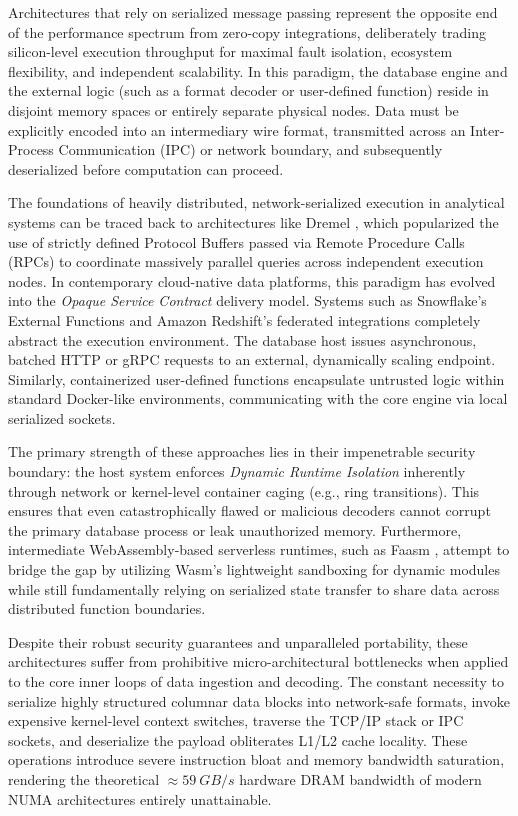 \documentclass[onecolumn]{IEEEtran}
\numberwithin{equation}{section}
\theoremstyle{definition}
\theoremstyle{remark}
\begin{document}
Architectures that rely on serialized message passing represent the opposite end of the performance spectrum from zero-copy integrations, deliberately trading silicon-level execution throughput for maximal fault isolation, ecosystem flexibility, and independent scalability. In this paradigm, the database engine and the external logic (such as a format decoder or user-defined function) reside in disjoint memory spaces or entirely separate physical nodes. Data must be explicitly encoded into an intermediary wire format, transmitted across an Inter-Process Communication (IPC) or network boundary, and subsequently deserialized before computation can proceed.

The foundations of heavily distributed, network-serialized execution in analytical systems can be traced back to architectures like Dremel \cite{melnik2011dremel}, which popularized the use of strictly defined Protocol Buffers passed via Remote Procedure Calls (RPCs) to coordinate massively parallel queries across independent execution nodes. In contemporary cloud-native data platforms, this paradigm has evolved into the \textit{Opaque Service Contract} delivery model. Systems such as Snowflake's External Functions \cite{snowflake2025external} and Amazon Redshift's federated integrations \cite{armenatzoglou2022amazon} completely abstract the execution environment. The database host issues asynchronous, batched HTTP or gRPC requests to an external, dynamically scaling endpoint. Similarly, containerized user-defined functions \cite{saur2022containerized} encapsulate untrusted logic within standard Docker-like environments, communicating with the core engine via local serialized sockets. 

The primary strength of these approaches lies in their impenetrable security boundary: the host system enforces \textit{Dynamic Runtime Isolation} inherently through network or kernel-level container caging (e.g., ring transitions). This ensures that even catastrophically flawed or malicious decoders cannot corrupt the primary database process or leak unauthorized memory. Furthermore, intermediate WebAssembly-based serverless runtimes, such as Faasm \cite{shillaker2020faasm}, attempt to bridge the gap by utilizing Wasm's lightweight sandboxing for dynamic modules while still fundamentally relying on serialized state transfer to share data across distributed function boundaries.

Despite their robust security guarantees and unparalleled portability, these architectures suffer from prohibitive micro-architectural bottlenecks when applied to the core inner loops of data ingestion and decoding. The constant necessity to serialize highly structured columnar data blocks into network-safe formats, invoke expensive kernel-level context switches, traverse the TCP/IP stack or IPC sockets, and deserialize the payload obliterates L1/L2 cache locality. These operations introduce severe instruction bloat and memory bandwidth saturation, rendering the theoretical $\approx \SI{59}{GB/s}$ hardware DRAM bandwidth of modern NUMA architectures entirely unattainable.
\end{document}
